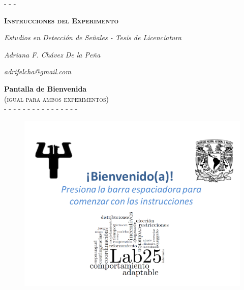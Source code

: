 \documentclass[a4paper ]{article}
\begin{document}
- - -

\vspace{50mm}
\begin{center}
{\Huge \textsc{\textbf{Instrucciones del Experimento}}}\\
\end{center}

\begin{center}
\textit{\huge Estudios en Detección de Señales - Tesis de Licenciatura}\\
\bigskip
\end{center}

\begin{center}
\textit{\huge Adriana F. Chávez De la Peña}\\
\end{center}

\begin{center}
\vfill
\textit{\huge adrifelcha@gmail.com}\\
\end{center}
\newpage

\begin{center}
{\LARGE \textbf{Pantalla de Bienvenida}}\\
{\large \textsc{(igual para ambos experimentos)}}\\
-  -  -  -  -  -  -  -  -  -  -  -  -  -  -  -
\smallskip
\end{center}
\vspace{3mm}
\begin{figure}[th]
\centering
\includegraphics[width=.7\textwidth]{Figures/Inst_Bienvenido} 
\end{figure}
\clearpage
\end{document}
